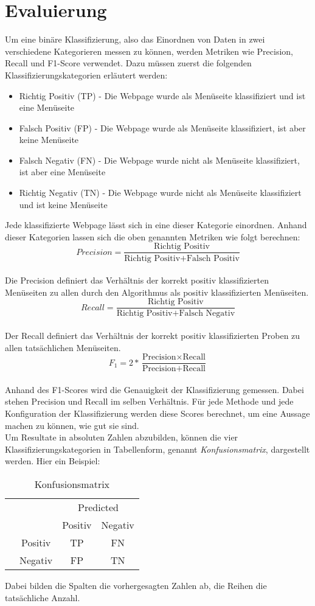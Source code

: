 \section{Evaluierung}
Um eine binäre Klassifizierung, also das Einordnen von Daten in zwei verschiedene Kategorieren messen zu können, werden Metriken wie Precision, Recall und F1-Score verwendet.
Dazu müssen zuerst die folgenden Klassifizierungskategorien erläutert werden:
\begin{itemize}
	\item Richtig Positiv (TP) - Die Webpage wurde als Menüseite klassifiziert und ist eine Menüseite
	\item Falsch Positiv (FP) - Die Webpage wurde als Menüseite klassifiziert, ist aber keine Menüseite
	\item Falsch Negativ (FN) - Die Webpage wurde nicht als Menüseite klassifiziert, ist aber eine Menüseite
	\item Richtig Negativ (TN) - Die Webpage wurde nicht als Menüseite klassifiziert und ist keine Menüseite
\end{itemize}
Jede klassifizierte Webpage lässt sich in eine dieser Kategorie einordnen.
Anhand dieser Kategorien lassen sich die oben genannten Metriken wie folgt berechnen:\\
\[Precision=\frac{\text{Richtig Positiv}}{\text{Richtig Positiv} + \text{Falsch Positiv}}\]\\
Die Precision definiert das Verhältnis der korrekt positiv klassifizierten Menüseiten zu allen durch den Algorithmus als positiv klassifizierten Menüseiten.\\
\[Recall=\frac{\text{Richtig Positiv}}{\text{Richtig Positiv} + \text{Falsch Negativ}}\]\\
Der Recall definiert das Verhältnis der korrekt positiv klassifizierten Proben zu allen tatsächlichen Menüseiten.\\
\[F_{1}=2*\frac{\text{Precision} \times \text{Recall}}{\text{Precision} + \text{Recall}}\]\\
Anhand des F1-Scores wird die Genauigkeit der Klassifizierung gemessen.
Dabei stehen Precision und Recall im selben Verhältnis.
Für jede Methode und jede Konfiguration der Klassifizierung werden diese Scores berechnet, um eine Aussage machen zu können, wie gut sie sind.\\
Um Resultate in absoluten Zahlen abzubilden, können die vier Klassifizierungskategorien in Tabellenform, genannt \emph{Konfusionsmatrix}, dargestellt werden.
Hier ein Beispiel:
\begin{table}[H]
	\centering
	\begin{tabular}{@{}cc|cc@{}}
		\multicolumn{1}{c}{} &\multicolumn{1}{c}{} &\multicolumn{2}{c}{Predicted} \\ 
		\multicolumn{1}{c}{} & 
		\multicolumn{1}{c|}{} & 
		\multicolumn{1}{c}{Positiv} & 
		\multicolumn{1}{c}{Negativ} \\ 
		\cline{2-4}
		\multirow[c]{2}{*}{\rotatebox[origin=tr]{90}{Actual}}
		& Positiv  & TP   & FN   \\[1.5ex]
		& Negativ  & FP   & TN \\ 
		\cline{2-4}
	\end{tabular}
	\caption{Konfusionsmatrix}
\end{table}
Dabei bilden die Spalten die vorhergesagten Zahlen ab, die Reihen die tatsächliche Anzahl.
